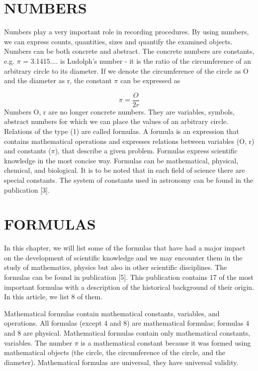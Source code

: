 \documentclass[conference]{IEEEtran}
\begin{document}
\section{NUMBERS}

Numbers play a very important role in recording procedures. By using numbers, we can express
counts, quantities, sizes and quantify the examined objects. Numbers can be both concrete and
abstract. The concrete numbers are constants, e.g. $\pi$ = 3.1415.... is Ludolph's number - it is the ratio of
the circumference of an arbitrary circle to its diameter. If we denote the circumference of the circle as
O and the diameter as r, the constant $\pi$ can be expressed as

\begin{equation}
\pi={\frac{O}{2r}}
\end{equation}
Numbers O, r are no longer concrete numbers. They are variables, symbols, abstract numbers for
which we can place the values of an arbitrary circle. Relations of the type (1) are called formulas. A
formula is an expression that contains mathematical operations and expresses relations between
variables (O, r) and constants ($\pi$), that describe a given problem. Formulas express scientific
knowledge in the most concise way. Formulas can be mathematical, physical, chemical, and
biological. It is to be noted that in each field of science there are special constants. The system of
constants used in astronomy can be found in the publication [3].

\section{FORMULAS}

In this chapter, we will list some of the formulas that have had a major impact on the development
of scientific knowledge and we may encounter them in the study of mathematics, physics but also in
other scientific disciplines. The formulas can be found in publication [5]. This publication contains 17
of the most important formulas with a description of the historical background of their origin. In this
article, we list 8 of them.

Mathematical formulas contain mathematical constants, variables, and operations. All formulas
(except 4 and 8) are mathematical formulas; formulas 4 and 8 are physical. Mathematical formulas
contain only mathematical constants, variables. The number $\pi$ is a mathematical constant because it
was formed using mathematical objects (the circle, the circumference of the circle, and the diameter).
Mathematical formulas are universal, they have universal validity.
\end{document}
